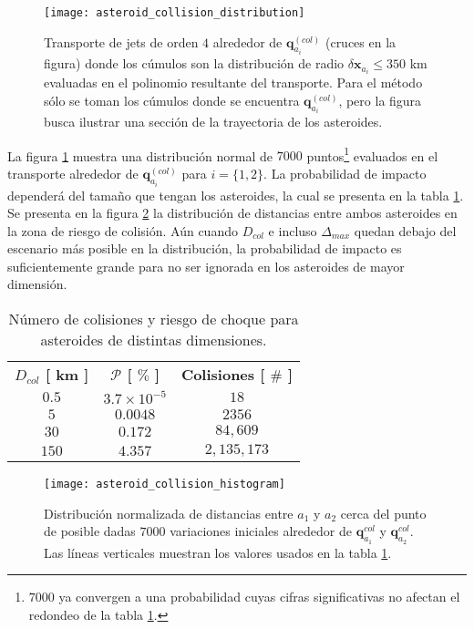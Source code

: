 \begin{figure}
 \centering
 \texttt{[image: asteroid\_collision\_distribution]}
 \caption{Transporte de jets de orden $4$ alrededor de $\mathbf{q}_{a_i}^{(col)}$ (cruces en la figura) donde los cúmulos son la distribución de radio $\delta\mathbf{x}_{a_i} \leq 350$ km evaluadas en el polinomio resultante del transporte. Para el método sólo se toman los cúmulos donde se encuentra $\mathbf{q}_{a_i}^{(col)}$, pero la figura busca ilustrar una sección de la trayectoria de los asteroides.}
 \label{fig:asteroid_collision_distribution}
\end{figure}

La figura \ref{fig:asteroid_collision_distribution} muestra una distribución normal de $7000$ puntos\footnote{$7000$ ya convergen a una probabilidad cuyas cifras significativas no afectan el redondeo de la tabla \ref{table:collision_table}.} evaluados en el transporte alrededor de $\mathbf{q}_{a_i}^{(col)}$ para $i = \{1,2\}$. La probabilidad de impacto dependerá del tamaño que tengan los asteroides, la cual se presenta en la tabla \ref{table:collision_table}. Se presenta en la figura \ref{fig:asteroid_collision_histogram} la distribución de distancias entre ambos asteroides en la zona de riesgo de colisión. Aún cuando $D_{col}$ e incluso $\Delta_{max}$ quedan debajo del escenario más posible en la distribución, la probabilidad de impacto es suficientemente grande para no ser ignorada en los asteroides de mayor dimensión.

\begin{table}[h!]
\centering
\begin{tabular}{c|c|c}
\toprule
\textbf{$ D_{col}$ [ km ]} & \textbf{$\mathcal{P}$ [ $\%$ ]} & \textbf{Colisiones [ $ \# $ ]} \\ \cmidrule(l){1-3} 
\textbf{$0.5$} &   $3.7 \times 10^{-5}$   & $18$          \\
\textbf{$5$}   &   $0.0048$               & $2356$        \\
\textbf{$30$}  &   $0.172$                & $84,609$     \\
\textbf{$150$} &   $4.357$                & $2,135,173$   \\ \bottomrule 
\end{tabular}
\caption{Número de colisiones y riesgo de choque para asteroides de distintas dimensiones.}
\label{table:collision_table}
\end{table}

\begin{figure}
 \centering
 \texttt{[image: asteroid\_collision\_histogram]}
 \caption{Distribución normalizada de distancias entre $a_1$ y $a_2$ cerca del punto de posible dadas $7000$ variaciones iniciales alrededor de $\mathbf{q}_{a_1}^{col}$ y $\mathbf{q}_{a_2}^{col}$. Las líneas verticales muestran los valores usados en la tabla \ref{table:collision_table}.}
 \label{fig:asteroid_collision_histogram}
\end{figure}



